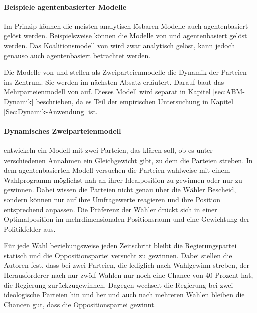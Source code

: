 \paragraph{Beispiele agentenbasierter Modelle}

Im Prinzip können die meisten analytisch lösbaren Modelle auch agentenbasiert gelöst werden. Beispielsweise können die Modelle von \citet{hotelling1929} und \citet{aspremont1979} agentenbasiert gelöst werden.
Das Koalitionsmodell von \citet{laver1990coalitions} wird zwar analytisch gelöst, kann jedoch genauso auch agentenbasiert betrachtet werden.

Die Modelle von \citet{kollman1992adaptive} und \citet{kollman1998political} stellen als Zweiparteienmodelle die Dynamik der Parteien ins Zentrum.
Sie werden im nächsten Absatz erläutert.
Darauf baut das Mehrparteienmodell von \citet{laver2005policy} auf. Dieses Modell wird separat in Kapitel \ref{sec:ABM-Dynamik} beschrieben, da es Teil der empirischen Untersuchung in Kapitel \ref{Sec:Dynamik-Anwendung} ist.

\paragraph{Dynamisches Zweiparteienmodell}

\citet{kollman1992adaptive} entwickeln ein Modell mit zwei Parteien, das klären soll, ob es unter verschiedenen Annahmen ein Gleichgewicht gibt, zu dem die Parteien streben. In dem agentenbasierten Modell versuchen die Parteien wahlweise mit einem Wahlprogramm möglichst nah an ihrer Idealposition zu gewinnen oder nur zu gewinnen. Dabei wissen die Parteien nicht genau über die Wähler Bescheid, sondern können nur auf ihre Umfragewerte reagieren und ihre Position entsprechend anpassen. Die Präferenz der Wähler drückt sich in einer Optimalposition im mehrdimensionalen Positionsraum und eine Gewichtung der Politikfelder aus. 
\citep[S.\,930-931]{kollman1992adaptive}

Für jede Wahl beziehungsweise jeden Zeitschritt bleibt die Regierungspartei statisch und die Oppositionspartei versucht zu gewinnen. Dabei stellen die Autoren fest, dass bei zwei Parteien, die lediglich nach Wahlgewinn streben, der Herausforderer nach nur zwölf Wahlen nur noch eine Chance von 40 Prozent hat, die Regierung zurückzugewinnen. Dagegen wechselt die Regierung bei zwei ideologische Parteien hin und her und auch nach mehreren Wahlen bleiben die Chancen gut, dass die Oppositionspartei gewinnt. \citep[S.\,934-5]{kollman1992adaptive}

